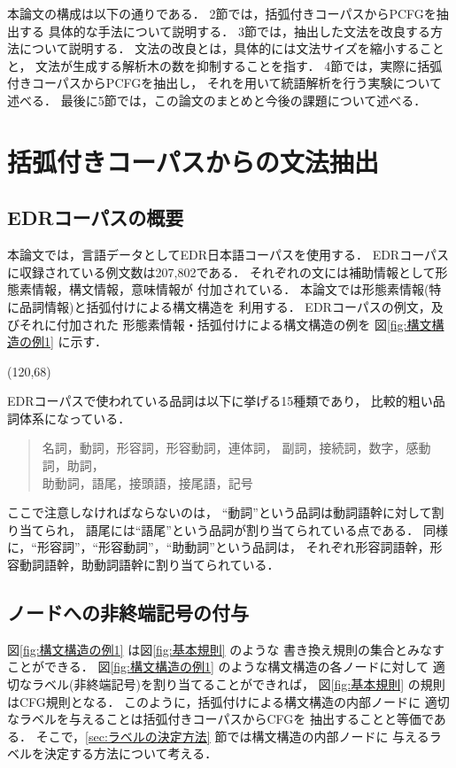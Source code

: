 本論文の構成は以下の通りである．
2節では，括弧付きコーパスからPCFGを抽出する
具体的な手法について説明する．
3節では，抽出した文法を改良する方法について説明する．
文法の改良とは，具体的には文法サイズを縮小することと，
文法が生成する解析木の数を抑制することを指す．
4節では，実際に括弧付きコーパスからPCFGを抽出し，
それを用いて統語解析を行う実験について述べる．
最後に5節では，この論文のまとめと今後の課題について述べる．
\section{括弧付きコーパスからの文法抽出}
\label{sec:文法抽出}
\subsection{EDRコーパスの概要}
\label{sec:EDRコーパスの概要}

本論文では，言語データとしてEDR日本語コーパスを使用する．
EDRコーパスに収録されている例文数は207,802である．
それぞれの文には補助情報として形態素情報，構文情報，意味情報が
付加されている．
本論文では形態素情報(特に品詞情報)と括弧付けによる構文構造を
利用する．
EDRコーパスの例文，及びそれに付加された
形態素情報・括弧付けによる構文構造の例を
図\ref{fig:構文構造の例1} に示す．

\begin{center}
  \atari(120,68)

\end{center}

EDRコーパスで使われている品詞は以下に挙げる15種類であり，
比較的粗い品詞体系になっている．
\begin{quote}
  名詞，動詞，形容詞，形容動詞，連体詞，
  副詞，接続詞，数字，感動詞，助詞，\\
  助動詞，語尾，接頭語，接尾語，記号
\end{quote}
ここで注意しなければならないのは，
``動詞''という品詞は動詞語幹に対して割り当てられ，
語尾には``語尾''という品詞が割り当てられている点である．
同様に，``形容詞''，``形容動詞''，``助動詞''という品詞は，
それぞれ形容詞語幹，形容動詞語幹，助動詞語幹に割り当てられている．
\subsection{ノードへの非終端記号の付与}
\label{sec:ノードへの非終端記号の付与}

図\ref{fig:構文構造の例1} は図\ref{fig:基本規則} のような
書き換え規則の集合とみなすことができる．
図\ref{fig:構文構造の例1} のような構文構造の各ノードに対して
適切なラベル(非終端記号)を割り当てることができれば，
図\ref{fig:基本規則} の規則はCFG規則となる．
このように，括弧付けによる構文構造の内部ノードに
適切なラベルを与えることは括弧付きコーパスからCFGを
抽出することと等価である．
そこで，\ref{sec:ラベルの決定方法} 節では構文構造の内部ノードに
与えるラベルを決定する方法について考える．

